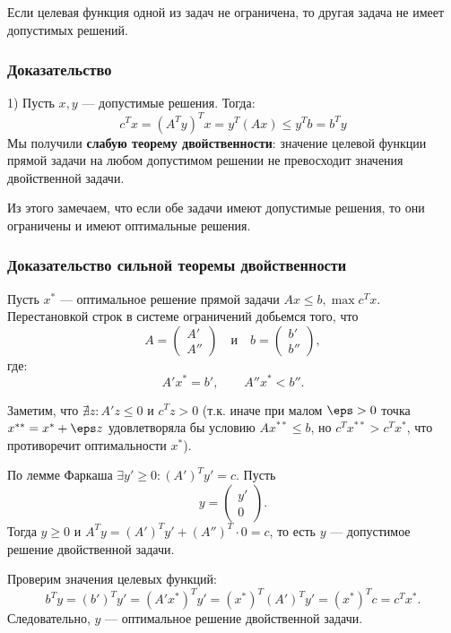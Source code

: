 \begin{Corollary}{}{}
Если целевая функция одной из задач не ограничена, то другая задача не имеет допустимых решений.
\end{Corollary}

\subsubsection*{Доказательство}

1) Пусть $x, y$ — допустимые решения. Тогда:
\[
c^T x = (A^T y)^T x = y^T (Ax) \le y^T b = b^T y
\]
Мы получили \textbf{слабую теорему двойственности}: значение целевой функции прямой задачи на любом допустимом решении не превосходит значения двойственной задачи.

Из этого замечаем, что если обе задачи имеют допустимые решения, то они ограничены и имеют оптимальные решения.

\subsubsection*{Доказательство сильной теоремы двойственности}

Пусть $x^*$ — оптимальное решение прямой задачи $Ax \le b, \max c^T x$. 
Перестановкой строк в системе ограничений добьемся того, что
\[
A = \begin{pmatrix} A' \\ A'' \end{pmatrix}
\quad \text{и} \quad
b = \begin{pmatrix} b' \\ b'' \end{pmatrix},
\]
где:
\[
A' x^* = b', \qquad A'' x^* < b''.
\]

Заметим, что $\nexists z : A' z \le 0$ и $c^T z > 0$ (т.к. иначе при малом $\eps > 0$ точка $x^{**} = x^* + \eps z$ удовлетворяла бы условию $A x^{**} \le b$, но $c^T x^{**} > c^T x^*$, что противоречит оптимальности $x^*$).

По лемме Фаркаша $\exists y' \ge 0 : (A')^T y' = c$. 
Пусть
\[
y = \begin{pmatrix} y' \\ 0 \end{pmatrix}.
\]
Тогда $y \ge 0$ и $A^T y = (A')^T y' + (A'')^T \cdot 0 = c$, то есть $y$ — допустимое решение двойственной задачи.

Проверим значения целевых функций:
\[
b^T y = (b')^T y' = (A' x^*)^T y' = (x^*)^T (A')^T y' = (x^*)^T c = c^T x^*.
\]
Следовательно, $y$ — оптимальное решение двойственной задачи.

